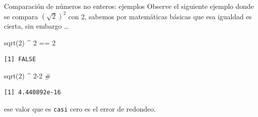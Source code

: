 \documentclass[
  ignorenonframetext,
  aspectratio=169,
  spanish,
]{beamer}
\newenvironment{Shaded}{\begin{snugshade}}{\end{snugshade}}
\newcommand{\CommentTok}[1]{\textcolor[rgb]{0.37,0.37,0.37}{#1}}
\newcommand{\DecValTok}[1]{\textcolor[rgb]{0.68,0.00,0.00}{#1}}
\newcommand{\FunctionTok}[1]{\textcolor[rgb]{0.28,0.35,0.67}{#1}}
\newcommand{\NormalTok}[1]{\textcolor[rgb]{0.00,0.23,0.31}{#1}}
\newcommand{\SpecialCharTok}[1]{\textcolor[rgb]{0.37,0.37,0.37}{#1}}
\begin{document}
\begin{frame}[fragile]{Comparación de números no enteros: ejemplos}
\label{comparaciuxf3n-de-nuxfameros-no-enteros-ejemplos}
Observe el siguiente ejemplo donde se compara
\(\left (\sqrt 2\right)^2\) con 2, sabemos por matemáticas básicas que
esa igualdad es cierta, sin embargo \ldots{}

\begin{Shaded}
\begin{Highlighting}[]
\FunctionTok{sqrt}\NormalTok{(}\DecValTok{2}\NormalTok{) }\SpecialCharTok{\^{}} \DecValTok{2} \SpecialCharTok{==} \DecValTok{2} 
\end{Highlighting}
\end{Shaded}

\begin{verbatim}
[1] FALSE
\end{verbatim}

\begin{Shaded}
\begin{Highlighting}[]
\FunctionTok{sqrt}\NormalTok{(}\DecValTok{2}\NormalTok{) }\SpecialCharTok{\^{}} \DecValTok{2{-}2}  \CommentTok{\# }
\end{Highlighting}
\end{Shaded}

\begin{verbatim}
[1] 4.440892e-16
\end{verbatim}

ese valor que es \texttt{casi} cero es el error de redondeo.
\end{frame}
\end{document}
